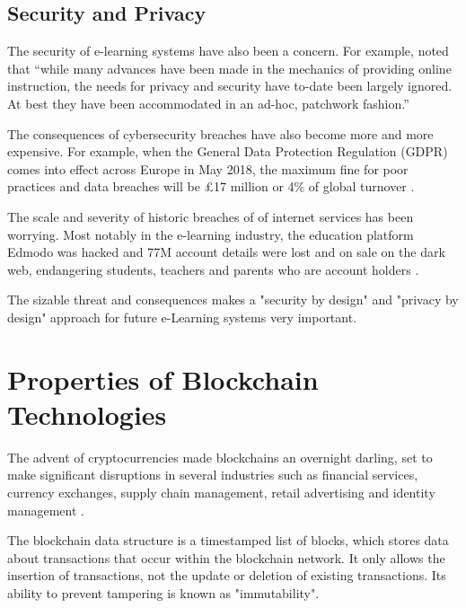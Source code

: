 
\subsection{Security and Privacy}

The security of e-learning systems have also been a concern. For example, \citet{el2003privacy} noted that “while many 
advances have been made in the mechanics of providing online instruction, the needs for privacy and security have to-date 
been largely ignored. At best they have been accommodated in an ad-hoc, patchwork fashion.”

The consequences of cybersecurity breaches have also become more and more expensive. For example, when the General Data 
Protection Regulation (GDPR) comes into effect across Europe in May 2018, the maximum fine for poor practices and data 
breaches will be £17 million or 4\% of global turnover \citep{ico2017gdpr}.

The scale and severity of historic breaches of of internet services has been worrying. Most notably in the e-learning 
industry, the education platform Edmodo was hacked and 77M account details were lost and on sale on the dark 
web, endangering students, teachers and parents who are account holders \citep{opsecmonkey2017edmodo}.

The sizable threat and consequences makes a "security by design" and "privacy by design" approach for future e-Learning 
systems very important.

\section{Properties of Blockchain Technologies}

The advent of cryptocurrencies made blockchains an overnight darling, set to make significant disruptions 
in several industries such as financial services, currency exchanges, supply chain management, retail 
advertising and identity management \citep{forbes2017industries}.

The blockchain data structure is a timestamped list of blocks, which stores data about transactions
that occur within the blockchain network. It only allows the insertion of transactions, not the update 
or deletion of existing transactions. Its ability to prevent tampering is known as "immutability". \citep[p.182]{xu2016blockchain}

